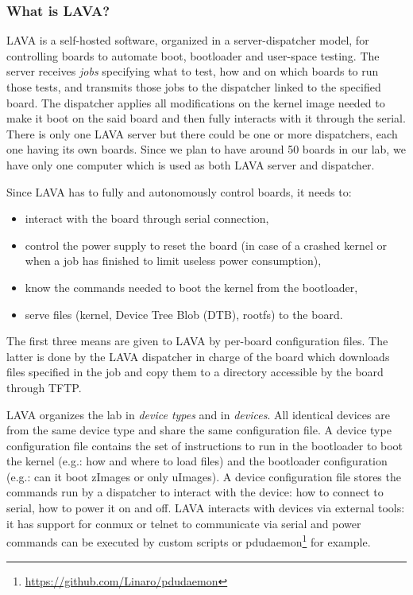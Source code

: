 \subsubsection{What is LAVA?}

LAVA is a self-hosted software, organized in a server-dispatcher model, for controlling boards to automate boot, bootloader and user-space testing. The server receives \textit{jobs} specifying what to test, how and on which boards to run those tests, and transmits those jobs to the dispatcher linked to the specified board. The dispatcher applies all modifications on the kernel image needed to make it boot on the said board and then fully interacts with it through the serial. There is only one LAVA server but there could be one or more dispatchers, each one having its own boards. Since we plan to have around 50 boards in our lab, we have only one computer which is used as both LAVA server and dispatcher.

Since LAVA has to fully and autonomously control boards, it needs to:
\begin{itemize}
  \item interact with the board through serial connection,
  \item control the power supply to reset the board (in case of a crashed kernel or when a job has finished to limit useless power consumption),
  \item know the commands needed to boot the kernel from the bootloader,
  \item serve files (kernel, Device Tree Blob (DTB), rootfs) to the board.
\end{itemize}

The first three means are given to LAVA by per-board configuration files. The latter is done by the LAVA dispatcher in charge of the board which downloads files specified in the job and copy them to a directory accessible by the board through TFTP.

LAVA organizes the lab in \textit{device types} and in \textit{devices}. All identical devices are from the same device type and share the same configuration file. A device type configuration file contains the set of instructions to run in the bootloader to boot the kernel (e.g.: how and where to load files) and the bootloader configuration (e.g.: can it boot zImages or only uImages). A device configuration file stores the commands run by a dispatcher to interact with the device: how to connect to serial, how to power it on and off. LAVA interacts with devices via external tools: it has support for conmux or telnet to communicate via serial and power commands can be executed by custom scripts or pdudaemon\footnote{\url{https://github.com/Linaro/pdudaemon}} for example.

